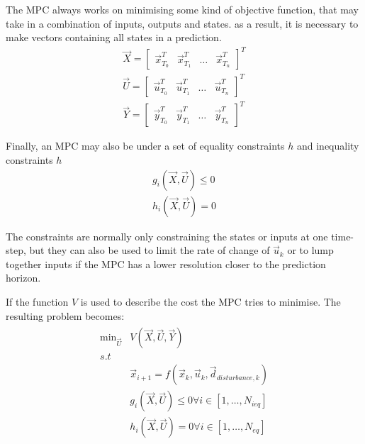 \noindent
The MPC always works on minimising some kind of objective function, that may take in a combination of inputs, outputs and states. as a result, it is necessary to make vectors containing all states in a prediction.
\begin{align}
  \vec{X} =
  \begin{bmatrix}
    \vec{x}_{T_0}^T & \vec{x}_{T_1}^T & \hdots & \vec{x}_{T_n}^T
  \end{bmatrix}^T \\
  \vec{U} =
  \begin{bmatrix}
    \vec{u}_{T_0}^T & \vec{u}_{T_1}^T & \hdots & \vec{u}_{T_n}^T
  \end{bmatrix}^T \\
  \vec{Y} =
  \begin{bmatrix}
    \vec{y}_{T_0}^T & \vec{y}_{T_1}^T & \hdots & \vec{y}_{T_n}^T
  \end{bmatrix}^T
\end{align}

\noindent
Finally, an MPC may also be under a set of equality constraints $h$ and inequality constraints $h$
\begin{align}
  g_i(\vec{X}, \vec{U}) \leq 0 \\
  h_i(\vec{X}, \vec{U}) = 0
\end{align}

\noindent
The constraints are normally only constraining the states or inputs at one time-step, but they can also be used to limit the rate of change of $\vec{u}_k$ or to lump together inputs if the MPC has a lower resolution closer to the prediction horizon.

\noindent
If the function $V$ is used to describe the cost the MPC tries to minimise. The resulting problem becomes:
\begin{gather}
\begin{split}
  \text{min}_{\vec{U}} & V(\vec{X}, \vec{U}, \vec{Y})                                                      \\
  s.t                                                                                               \\
                & \vec{x}_{i+1} = f\left( \vec{x}_{k} , \vec{u}_k , \vec{d}_{disturbance,k} \right)\\
                & g_i(\vec{X}, \vec{U}) \leq 0  \forall i \in \left[ 1, \dots , N_{ieq} \right]     \\
                & h_i(\vec{X}, \vec{U}) = 0     \forall i \in \left[ 1, \dots , N_{eq} \right]      \\
  \end{split}
  \label{eq:generic_MPC_problem}
\end{gather}

